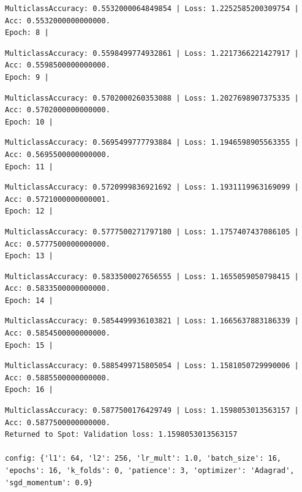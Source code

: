 \documentclass[
  letterpaper,
  DIV=11,
  numbers=noendperiod]{scrreprt}
\begin{document}
\begin{verbatim}
MulticlassAccuracy: 0.5532000064849854 | Loss: 1.2252585200309754 | Acc: 0.5532000000000000.
Epoch: 8 | 
\end{verbatim}

\begin{verbatim}
MulticlassAccuracy: 0.5598499774932861 | Loss: 1.2217366221427917 | Acc: 0.5598500000000000.
Epoch: 9 | 
\end{verbatim}

\begin{verbatim}
MulticlassAccuracy: 0.5702000260353088 | Loss: 1.2027698907375335 | Acc: 0.5702000000000000.
Epoch: 10 | 
\end{verbatim}

\begin{verbatim}
MulticlassAccuracy: 0.5695499777793884 | Loss: 1.1946598905563355 | Acc: 0.5695500000000000.
Epoch: 11 | 
\end{verbatim}

\begin{verbatim}
MulticlassAccuracy: 0.5720999836921692 | Loss: 1.1931119963169099 | Acc: 0.5721000000000001.
Epoch: 12 | 
\end{verbatim}

\begin{verbatim}
MulticlassAccuracy: 0.5777500271797180 | Loss: 1.1757407437086105 | Acc: 0.5777500000000000.
Epoch: 13 | 
\end{verbatim}

\begin{verbatim}
MulticlassAccuracy: 0.5833500027656555 | Loss: 1.1655059050798415 | Acc: 0.5833500000000000.
Epoch: 14 | 
\end{verbatim}

\begin{verbatim}
MulticlassAccuracy: 0.5854499936103821 | Loss: 1.1665637883186339 | Acc: 0.5854500000000000.
Epoch: 15 | 
\end{verbatim}

\begin{verbatim}
MulticlassAccuracy: 0.5885499715805054 | Loss: 1.1581050729990006 | Acc: 0.5885500000000000.
Epoch: 16 | 
\end{verbatim}

\begin{verbatim}
MulticlassAccuracy: 0.5877500176429749 | Loss: 1.1598053013563157 | Acc: 0.5877500000000000.
Returned to Spot: Validation loss: 1.1598053013563157

config: {'l1': 64, 'l2': 256, 'lr_mult': 1.0, 'batch_size': 16, 'epochs': 16, 'k_folds': 0, 'patience': 3, 'optimizer': 'Adagrad', 'sgd_momentum': 0.9}
\end{verbatim}
\end{document}
